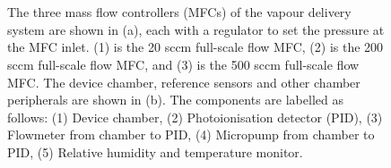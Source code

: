 \documentclass[
  a4paper,
]{scrbook}
\begin{document}
\begin{figure}
\begin{minipage}[t]{0.03\linewidth}
{\centering 


}

\end{minipage}%
%
\begin{minipage}[t]{0.01\linewidth}

{\centering 

~

}

\end{minipage}%
%
\begin{minipage}[t]{0.70\linewidth}

{\centering 


}

\end{minipage}%
%
\begin{minipage}[t]{0.15\linewidth}

{\centering 

~

}

\end{minipage}%

\caption{\label{fig-delivery-system}The three mass flow controllers
(MFCs) of the vapour delivery system are shown in (a), each with a
regulator to set the pressure at the MFC inlet. (1) is the 20 sccm
full-scale flow MFC, (2) is the 200 sccm full-scale flow MFC, and (3) is
the 500 sccm full-scale flow MFC. The device chamber, reference sensors
and other chamber peripherals are shown in (b). The components are
labelled as follows: (1) Device chamber, (2) Photoionisation detector
(PID), (3) Flowmeter from chamber to PID, (4) Micropump from chamber to
PID, (5) Relative humidity and temperature monitor.}

\end{figure}
\end{document}
